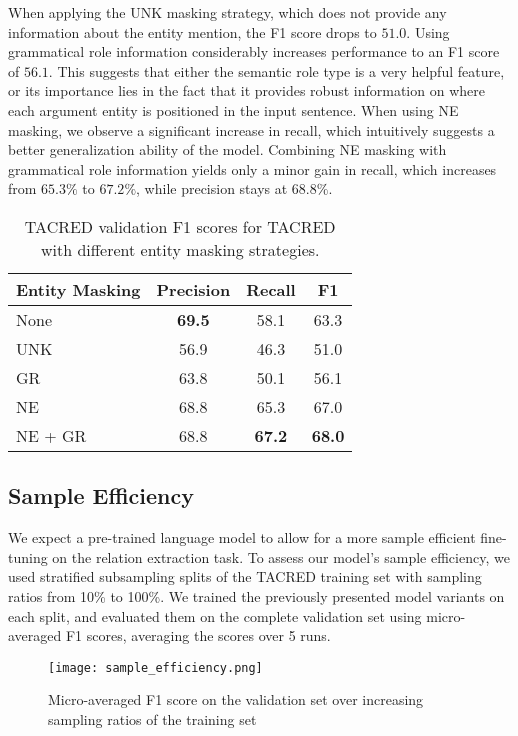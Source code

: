 \documentclass[akbc,twoside,11pt]{article}
\begin{document}
When applying the UNK masking strategy, which does not provide any information about the entity mention, the F1 score drops to $51.0$. Using grammatical role information considerably increases performance to an F1 score of $56.1$. This suggests that either the semantic role type is a very helpful feature, or its importance lies in the fact that it provides robust information on where each argument entity is positioned in the input sentence. When using NE masking, we observe a significant increase in recall, which intuitively suggests a better generalization ability of the model. Combining NE masking with grammatical role information yields only a minor gain in recall, which increases from $65.3\%$ to $67.2\%$, while precision stays at $68.8\%$.

\begin{table}[ht!]
    \begin{center}
        \begin{tabular}{p{3cm} c c c}
            \hline
            Entity Masking & Precision & Recall & F1 \\
            \hline
            None & \textbf{69.5} & 58.1 & 63.3 \\
            UNK & 56.9 & 46.3 & 51.0 \\
            GR & 63.8 & 50.1 & 56.1 \\
            NE & 68.8 & 65.3 & 67.0 \\
            NE + GR & 68.8 & \textbf{67.2} & \textbf{68.0} \\
            \hline
        \end{tabular}
        \caption{TACRED validation F1 scores for TACRED with different entity masking strategies.}
        \label{tab:robustness}
    \end{center}
\end{table}

\subsection{Sample Efficiency}
We expect a pre-trained language model to allow for a more sample efficient fine-tuning on the relation extraction task.
To assess our model's sample efficiency, we used stratified subsampling splits of the TACRED training set with sampling ratios from 10\% to 100\%. We trained the previously presented model variants on each split, and evaluated them on the complete validation set using micro-averaged F1 scores, averaging the scores over 5 runs.

\begin{figure}[ht!]
\centering
\texttt{[image: sample\_efficiency.png]}
\caption{Micro-averaged F1 score on the validation set over increasing sampling ratios of the training set}\label{fig:sample_efficiency}
\end{figure}
\end{document}
